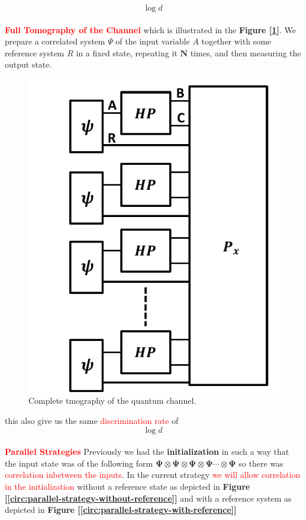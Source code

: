 \documentclass[a4paper,11pt]{article}
\begin{document}
\begin{equation}
	\text{log}\;d
\end{equation}
\\
\textbf{\textcolor{red}{Full Tomography of the Channel}} which is illustrated in the \textbf{Figure [\ref{circ:quantum-strategy-tomography}]}. We prepare a correlated system $\Psi$ of the input variable $A$ together with some reference system $R$ in a fixed state, repeating it $\mathbf{N}$ times, and then measuring the output state.
\begin{figure}[tbh!]
	\centering
	\includegraphics[width=0.5\linewidth]{pics/parallel-strategy-tomography}
	\caption{Complete tmography of the quantum channel.}
	\label{circ:quantum-strategy-tomography}
\end{figure}
this also give us the same \textcolor{red}{discrimination rate} of
\begin{equation}
	\text{log}\;d
\end{equation}
\\
\textbf{\textcolor{red}{Parallel Strategies}}
Previously we had the \textbf{initialization} in such a way that the input state was of the following form $\mathbf{\Psi} \otimes\mathbf{\Psi}\otimes\mathbf{\Psi}\otimes\mathbf{\Psi}\cdots\otimes\mathbf{\Psi}$ so there was \textcolor{red}{correlation inbetween the inputs}. In the current strategy \textcolor{red}{we will allow correlation in the initialization} without a reference state as depicted in \textbf{Figure [\ref{circ:parallel-strategy-without-reference}]} and with a reference system as depicted in \textbf{Figure [\ref{circ:parallel-strategy-with-reference}]}
\end{document}
